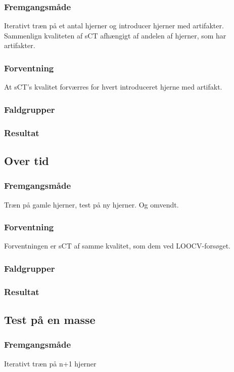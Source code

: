 \subsubsection{Fremgangsmåde}
Iterativt træn på et antal hjerner og introducer hjerner med artifakter.
Sammenlign kvaliteten af sCT afhængigt af andelen af hjerner, som har
artifakter.

\subsubsection{Forventning}
At sCT's kvalitet forværres for hvert introduceret hjerne med artifakt.

\subsubsection{Faldgrupper}

\subsubsection{Resultat}


\subsection{Over tid}
\subsubsection{Fremgangsmåde}
Træn på gamle hjerner, test på ny hjerner. Og omvendt.

\subsubsection{Forventning}
Forventningen er sCT af samme kvalitet, som dem ved LOOCV-forsøget.

\subsubsection{Faldgrupper}


\subsubsection{Resultat}

\subsection{Test på en masse}
\subsubsection{Fremgangsmåde}
Iterativt træn på n+1 hjerner

